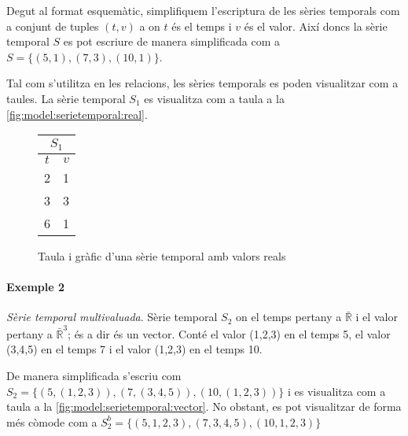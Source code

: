 Degut al format esquemàtic, simplifiquem l'escriptura de les sèries temporals com a conjunt de tuples $(t,v)$ a on $t$ és el temps i $v$ és el valor. Així doncs la sèrie temporal $S$ es pot escriure de manera simplificada com a 
$S = \{ (5,1), (7,3), (10,1) \}$.

Tal com s'utilitza en les relacions, les sèries temporals es poden visualitzar com a taules. La sèrie temporal $S_1$ es visualitza com a taula a la \autoref{fig:model:serietemporal:real}.

\begin{figure}[tp]
  \centering
  \begin{tabular}[c]{|c|c|}
    \multicolumn{2}{c}{$S_1$} \\ \hline
    $t$  & $v$ \\ \hline
    2  & 1 \\
    3  & 3 \\
    6  & 1 \\ \hline
  \end{tabular} \qquad
  \caption{Taula i gràfic d'una sèrie temporal amb valors reals}
  \label{fig:model:serietemporal:real}
\end{figure}


\paragraph{Exemple 2} \emph{Sèrie temporal multivaluada}.
Sèrie temporal $S_2$ on el temps pertany a $\bar{\mathbb{R}}$ i el valor pertany a  $\bar{\mathbb{R}}^3$; és a dir és un vector. Conté el valor (1,2,3) en el temps 5, el valor (3,4,5) en el temps 7 i el valor (1,2,3) en el temps 10.

De manera simplificada s'escriu com 
$S_2 = \{ (5,(1,2,3)), (7,(3,4,5)), (10,(1,2,3)) \}$ i es visualitza com a taula a la \autoref{fig:model:serietemporal:vector}. No obstant, es pot visualitzar de forma més còmode com a $S_2^b = \{ (5,1,2,3), (7,3,4,5), (10,1,2,3) \}$

